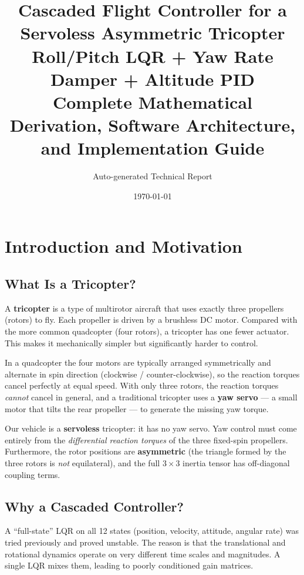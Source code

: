 \documentclass[12pt, a4paper]{article}
\title{%
    \textbf{Cascaded Flight Controller for a Servoless Asymmetric Tricopter} \\[6pt]
    \large Roll/Pitch LQR + Yaw Rate Damper + Altitude PID \\[4pt]
    \large Complete Mathematical Derivation, Software Architecture, \\ and Implementation Guide
}
\author{Auto-generated Technical Report}
\date{\today}
\begin{document}
\maketitle
\tableofcontents
\newpage

\section{Introduction and Motivation}

\subsection{What Is a Tricopter?}

A \textbf{tricopter} is a type of multirotor aircraft that uses exactly three propellers (rotors) to fly.  Each propeller is driven by a brushless DC motor.  Compared with the more common quadcopter (four rotors), a tricopter has one fewer actuator.  This makes it mechanically simpler but significantly harder to control.

In a quadcopter the four motors are typically arranged symmetrically and alternate in spin direction (clockwise / counter-clockwise), so the reaction torques cancel perfectly at equal speed.  With only three rotors, the reaction torques \emph{cannot} cancel in general, and a traditional tricopter uses a \textbf{yaw servo} --- a small motor that tilts the rear propeller --- to generate the missing yaw torque.

Our vehicle is a \textbf{servoless} tricopter: it has no yaw servo.  Yaw control must come entirely from the \emph{differential reaction torques} of the three fixed-spin propellers.  Furthermore, the rotor positions are \textbf{asymmetric} (the triangle formed by the three rotors is \emph{not} equilateral), and the full $3\times3$ inertia tensor has off-diagonal coupling terms.

\subsection{Why a Cascaded Controller?}

A ``full-state'' LQR on all 12 states (position, velocity, attitude, angular rate) was tried previously and proved unstable.  The reason is that the translational and rotational dynamics operate on very different time scales and magnitudes.  A single LQR mixes them, leading to poorly conditioned gain matrices.
\end{document}
